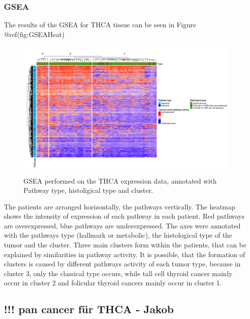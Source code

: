 \documentclass[
  parskip,
  oneside]{scrreprt}
\begin{document}
\hypertarget{gsea}{%
\subsubsection{GSEA}\label{gsea}}

The results of the GSEA for THCA tissue can be seen in Figure
@ref(fig:GSEAHeat)

\begin{figure}

{\centering \includegraphics[width=0.9\linewidth]{figures/THCA GSEA Heatmap fertig} 

}

\caption{GSEA performed on the THCA expression data, annotated with Pathway type, histoligical type and cluster.}\label{fig:GSEAHeat}
\end{figure}

The patients are arranged horizontally, the pathways vertically. The
heatmap shows the intensity of expression of each pathway in each
patient. Red pathways are overexpressed, blue pathways are
underexpressed. The axes were annotated with the pathways type (hallmark
or metabolic), the histological type of the tumor and the cluster. Three
main clusters form within the patients, that can be explained by
similarities in pathway activity. It is possible, that the formation of
clusters is caused by different pathways activity of each tumor type,
because in cluster 3, only the classical type occurs, while tall cell
thyroid cancer mainly occur in cluster 2 and folicular thyroid cancers
mainly occur in cluster 1.

\hypertarget{pan-cancer-fuxfcr-thca---jakob}{%
\subsection{!!! pan cancer für THCA -
Jakob}\label{pan-cancer-fuxfcr-thca---jakob}}
\end{document}

